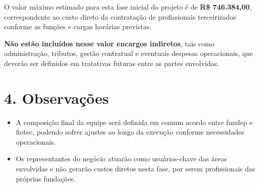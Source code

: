 \documentclass[12pt,a4paper]{report}
\begin{document}
    O valor máximo estimado para esta fase inicial do projeto é de \textbf{R\$ 746.384,00}, correspondente ao custo direto da contratação de profissionais terceirizados conforme as funções e cargas horárias previstas.

    \textbf{Não estão incluídos nesse valor encargos indiretos}, tais como administração, tributos, gestão contratual e eventuais despesas operacionais, que deverão ser definidos em tratativas futuras entre as partes envolvidas.

    \section*{4. Observações}

    \begin{itemize}
        \item A composição final da equipe será definida em comum acordo entre \gls{fundep} e \gls{fiotec}, podendo sofrer ajustes ao longo da execução conforme necessidades operacionais.
        \item Os representantes do negócio atuarão como usuários-chave das áreas envolvidas e não gerarão custos diretos nesta fase, por serem profissionais das próprias fundações.
    \end{itemize}
\end{document}
